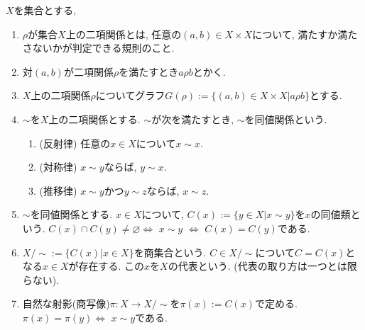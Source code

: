 \documentclass[dvipdfmx,a4paper,11pt]{article}
\theoremstyle{definition}
\begin{document}
\begin{tcolorbox}[
    colback = white,
    colframe = black!35!black,
    fonttitle = \bfseries,
    breakable = true]
    $X$を集合とする,
    \begin{enumerate}
    \setlength{\parskip}{0cm} 
  \setlength{\itemsep}{0cm} 
  \item $\rho$が集合$X$上の二項関係とは, 任意の$(a, b) \in X \times X$について, 満たすか満たさないかが判定できる規則のこと. 
 \item 対$(a, b)$が二項関係$\rho$を満たすとき$a \rho b$とかく. 
  \item $X$上の二項関係$\rho$についてグラフ$G(\rho):= \{ (a, b) \in X \times X | a \rho b\}$とする.
  \item $\sim$を$X$上の二項関係とする. $\sim$が次を満たすとき, $\sim$を同値関係という.
       \begin{enumerate}[label=(\arabic*).]
 \setlength{\parskip}{0cm}
  \setlength{\itemsep}{0pt}
  \item (反射律) 任意の$x \in X$について$x \sim x$.
  \item (対称律) $x \sim y$ならば, $y \sim x$.
  \item (推移律) $x \sim y$かつ$y \sim z$ならば, $x \sim z$.
  \end{enumerate}
  \item $\sim$を同値関係とする. $x \in X$について, $C(x):=\{ y \in X | x \sim y\}$を$x$の同値類という. $C(x) \cap C(y) \neq\varnothing$$\stackrel{}{\Longleftrightarrow}$ $x \sim y$ $\stackrel{}{\Longleftrightarrow}$ $C(x)=C(y)$である.
  \item $X/\sim := \{ C(x) | x \in X\}$を商集合という. $C \in X/\sim$について$C=C(x)$となる$x \in X$が存在する. この$x$を$X$の代表という. (代表の取り方は一つとは限らない).
  \item 自然な射影(商写像)$\pi : X \to X/\sim$を$\pi(x):=C(x)$で定める. $\pi(x)=\pi(y)$$\stackrel{}{\Longleftrightarrow}$ $x \sim y$である. 
        \end{enumerate}
 \end{tcolorbox}
 
\end{document}
